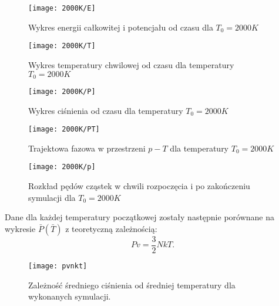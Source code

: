 \documentclass[a4paper,10pt]{article}
\begin{document}
	    \begin{figure}[h]
		    \centering
		    \texttt{[image: 2000K/E]}
		    \caption{Wykres energii całkowitej i potencjału od czasu dla $T_0 = 2000 K$}
		    \label{2000ke}
	    \end{figure}
	    \begin{figure}[h]
		    \centering
		    \texttt{[image: 2000K/T]}
		    \caption{Wykres temperatury chwilowej od czasu dla temperatury $T_0 = 2000 K$}
		    \label{2000kt}
	    \end{figure}
	    \begin{figure}[h]
		    \centering
		    \texttt{[image: 2000K/P]}
		    \caption{Wykres ciśnienia od czasu dla temperatury $T_0 = 2000 K$}
		    \label{2000kp}
	    \end{figure}
	    \begin{figure}[h]
		    \centering
		    \texttt{[image: 2000K/PT]}
		    \caption{Trajektowa fazowa w przestrzeni $p-T$ dla temperatury $T_0 = 2000 K$}
		    \label{2000kpt}
	    \end{figure}
	    \begin{figure}[h]
		    \centering
		    \texttt{[image: 2000K/p]}
		    \caption{Rozkład pędów cząstek w chwili rozpoczęcia i po zakończeniu symulacji dla $T_0 = 2000 K$}
		    \label{2000kpp}
	    \end{figure}	
	\clearpage
	Dane dla każdej temperatury początkowej zostały następnie porównane na wykresie $\bar{P}(\bar{T})$ z teoretyczną zależnością:
	\begin{equation}
		Pv = \frac{3}{2} N k T .
		\label{gaz}
	\end{equation}
	    \begin{figure}[h]
		    \centering
		    \texttt{[image: pvnkt]}
		    \caption{Zależność średniego ciśnienia od średniej temperatury dla wykonanych symulacji.}
		    \label{pT}
	    \end{figure}
\end{document}

